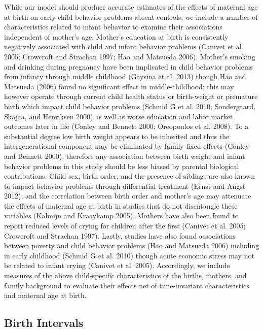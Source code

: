 \documentclass[]{article}
\begin{document}
While our model should produce accurate estimates of the effects of
maternal age at birth on early child behavior problems absent controls,
we include a number of characteristics related to infant behavior to
examine their associations independent of mother's age. Mother's
education at birth is consistently negatively associated with child and
infant behavior problems (Canivet et al. 2005; Crowcroft and Strachan
1997; Hao and Matsueda 2006). Mother's smoking and drinking during
pregnancy have been implicated in child behavior problems from infancy
through middle childhood (Gaysina et al. 2013) though Hao and Matsueda
(2006) found no significant effect in middle-childhood; this may however
operate through current child health status or birth-weight or premature
birth which impact child behavior problems (Schmid G et al. 2010;
Sondergaard, Skajaa, and Henriksen 2000) as well as worse education and
labor market outcomes later in life (Conley and Bennett 2000; Oreopoulos
et al. 2008). To a substantial degree low birth weight appears to be
inherited and thus the intergenerational component may be eliminated by
family fixed effects (Conley and Bennett 2000), therefore any
association between birth weight and infant behavior problems in this
study should be less biased by parental biological contributions. Child
sex, birth order, and the presence of siblings are also known to impact
behavior problems through differential treatment (Ernst and Angst 2012),
and the correlation between birth order and mother's age may attenuate
the effects of maternal age at birth in studies that do not disentangle
these variables (Kalmijn and Kraaykamp 2005). Mothers have also been
found to report reduced levels of crying for children after the first
(Canivet et al. 2005; Crowcroft and Strachan 1997). Lastly, studies have
also found associations between poverty and child behavior problems (Hao
and Matsueda 2006) including in early childhood (Schmid G et al. 2010)
though acute economic stress may not be related to infant crying
(Canivet et al. 2005). Accordingly, we include measures of the above
child-specific characteristics of the births, mothers, and family
background to evaluate their effects net of time-invariant
characteristics and maternal age at birth.

\subsection{Birth Intervals}\label{birth-intervals}
\end{document}
